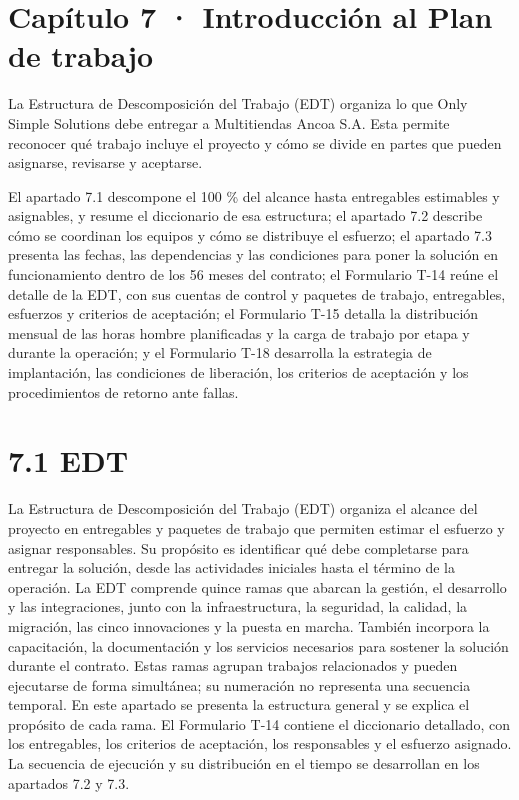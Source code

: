 \documentclass[11pt]{article}
\begin{document}
\makeatletter
\makeatother
\renewcommand{\tablename}{Tabla}
\renewcommand{\figurename}{Figura}
\renewcommand{\thefigure}{7.\arabic{figure}}
\renewcommand{\thetable}{7.\arabic{table}}

\tableofcontents
\clearpage
\renewcommand{\listfigurename}{Lista de figuras}
\listoffigures
\clearpage
\renewcommand{\listtablename}{Lista de tablas}
\listoftables
\clearpage

\section{Capítulo 7 · Introducción al Plan de trabajo}\label{capuxedtulo-7-introducciuxf3n-al-plan-de-trabajo}

La Estructura de Descomposición del Trabajo (EDT) organiza lo que Only Simple Solutions debe entregar a Multitiendas Ancoa S.A. Esta permite reconocer qué trabajo incluye el proyecto y cómo se divide en partes que pueden asignarse, revisarse y aceptarse.

El apartado 7.1 descompone el 100 \% del alcance hasta entregables estimables y asignables, y resume el diccionario de esa estructura; el apartado 7.2 describe cómo se coordinan los equipos y cómo  se distribuye el esfuerzo; el apartado 7.3 presenta las fechas, las dependencias y las condiciones para poner la solución en funcionamiento dentro de los 56 meses del contrato; el Formulario T-14 reúne el detalle de la EDT, con sus cuentas de control y paquetes de trabajo, entregables, esfuerzos y criterios de aceptación; el Formulario T-15 detalla la distribución mensual de las horas hombre planificadas y la carga de trabajo por etapa y durante la operación; y el Formulario T-18 desarrolla la estrategia de implantación, las condiciones de liberación, los criterios de aceptación y los procedimientos de retorno ante fallas.

\section{7.1 EDT}\label{edt}

La Estructura de Descomposición del Trabajo (EDT) organiza el alcance del proyecto en entregables y paquetes de trabajo que permiten estimar el esfuerzo y asignar responsables. Su propósito es identificar qué debe completarse para entregar la solución, desde las actividades iniciales hasta el término de la operación.
La EDT comprende quince ramas que abarcan la gestión, el desarrollo y las integraciones, junto con la infraestructura, la seguridad, la calidad, la migración, las cinco innovaciones y la puesta en marcha. También incorpora la capacitación, la documentación y los servicios necesarios para sostener la solución durante el contrato. Estas ramas agrupan trabajos relacionados y pueden ejecutarse de forma simultánea; su numeración no representa una secuencia temporal.
En este apartado se presenta la estructura general y se explica el propósito de cada rama. El Formulario T-14 contiene el diccionario detallado, con los entregables, los criterios de aceptación, los responsables y el esfuerzo asignado. La secuencia de ejecución y su distribución en el tiempo se desarrollan en los apartados 7.2 y 7.3.
\end{document}
